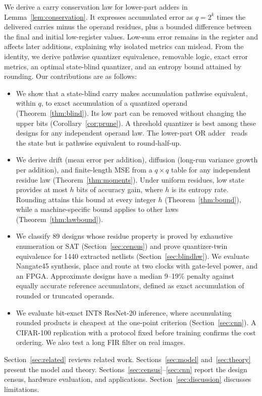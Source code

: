 \documentclass[preprint,12pt,numbers]{elsarticle}
\theoremstyle{definition}
\begin{document}
We derive a carry conservation law for lower-part adders in
Lemma~\ref{lem:conservation}. It expresses accumulated error as
$q=2^k$ times the delivered carries minus the operand residues, plus a
bounded difference between the final and initial low-register values.
Low-sum error remains in the register and affects later additions, explaining
why isolated metrics can mislead. From the identity,
we derive pathwise quantizer equivalence, removable logic, exact error
metrics, an optimal state-blind quantizer, and an entropy bound attained
by rounding.
Our contributions are as follows:
\begin{itemize}
\item We show that a state-blind carry makes accumulation pathwise
equivalent, within $q$, to exact accumulation of a
quantized operand (Theorem~\ref{thm:blind}). Its low part can be removed
without changing the upper bits (Corollary~\ref{cor:prune}).
A threshold quantizer is best among these designs for any independent
operand law. The lower-part OR adder~\cite{mahdiani2010loa} reads the state
but is pathwise equivalent to round-half-up.
\item We derive drift (mean error per addition), diffusion (long-run variance
growth per addition), and
finite-length MSE from a $q\times q$
table for any independent residue law (Theorem~\ref{thm:moments}). Under uniform residues, low state
provides at most $h$ bits of accuracy gain, where $h$ is its entropy rate.
Rounding attains this bound at every integer $h$ (Theorem~\ref{thm:bound}),
while a machine-specific bound applies to other laws
(Theorem~\ref{thm:lawbound}).
\item We classify 89 designs whose residue property is proved by exhaustive
enumeration or SAT (Section~\ref{sec:census}) and
prove quantizer-twin equivalence for 1440 extracted netlists
(Section~\ref{sec:blindhw}). We evaluate Nangate45 synthesis, place and
route at two clocks with gate-level power, and an FPGA. Approximate
designs have a median 9--19\% penalty against equally accurate reference
accumulators, defined as exact accumulation of rounded or truncated operands.
\item We evaluate bit-exact INT8 ResNet-20 inference, where accumulating
rounded products is cheapest at the one-point criterion
(Section~\ref{sec:cnn}). A CIFAR-100 replication with a protocol fixed
before training confirms the cost ordering. We also test a long FIR
filter on real images.
\end{itemize}
Section~\ref{sec:related} reviews related work.
Sections~\ref{sec:model} and~\ref{sec:theory} present the model and theory.
Sections~\ref{sec:census}--\ref{sec:cnn} report the design census,
hardware evaluation, and applications. Section~\ref{sec:discussion}
discusses limitations.
\end{document}
